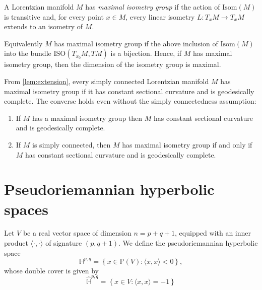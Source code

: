\documentclass{report}
\begin{document}
\begin{definition}
A Lorentzian manifold $M$ has \emph{maximal isometry group} if the action of $\mathrm{Isom}(M)$ is transitive and, 
for every point $x\in M$, every linear isometry $L:T_xM\to T_xM$ extends to an isometry of $M$.
\end{definition}
Equivalently $M$ has maximal isometry group if the above inclusion of $\mathrm{Isom}(M)$ into the bundle $\mathrm{ISO}(T_{x_0}M, TM)$ is a bijection.
Hence, if $M$ has maximal  isometry group, then the dimension of the isometry group is maximal.

From \cref{lem:extension}, every simply connected Lorentzian manifold $M$ has maximal isometry group if it has constant sectional curvature and is geodesically complete. The converse holds even without the simply connectedness assumption:
\begin{lemma} \label{lemma:max isom group implies constant curvature}
\begin{enumerate}[label=(\roman*)]
    Let $M$ be a Lorentzian manifold.
    \item If $M$ has a maximal isometry group then $M$ has  constant sectional curvature and is geodesically complete.
    \item If $M$ is simply connected, then $M$ has maximal isometry group if and only if $M$ has constant sectional curvature and is geodesically complete.
\end{enumerate}
\end{lemma}

\chapter{Pseudoriemannian hyperbolic spaces}
\begin{definition}
    Let $V$ be a real vector space of dimension $n = p+q+1$, equipped with an inner product $\langle \cdot, \cdot \rangle$ of signature $(p,q+1)$.
    We define the pseudoriemannian hyperbolic space
    \[
    \mathbb H^{p,q} = \left\{ x \in \mathbb P(V) : \langle x,x \rangle < 0\right\},
    \]
    whose double cover is given by 
    \[
    \hat{\mathbb H}^{p,q} = \left\{ x \in V : \langle x,x \rangle = -1 \right\}
    \]
\end{definition}
\end{document}
